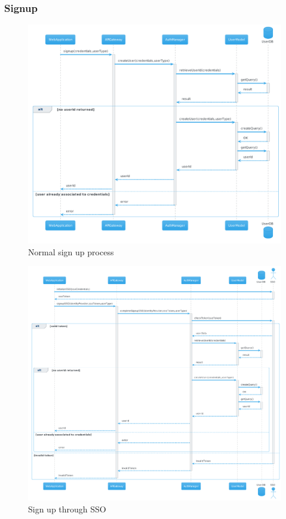 \subsubsection{Signup}
\begin{figure}[H]
    \centering
    \includegraphics[width=1\textwidth]{Diagrams/sequence/signup.png}
    \caption{Normal sign up process}
\end{figure}
\begin{figure}[H]
    \hspace{-0.7cm}
    \includegraphics[width=1.1\textwidth]{Diagrams/sequence/signup_SSO.png}
    \caption{Sign up through SSO}
\end{figure}

